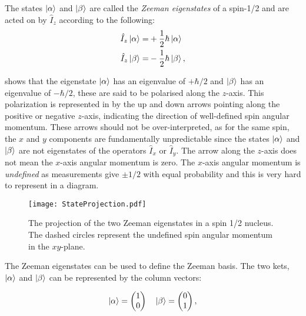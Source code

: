 The states $\ket{\alpha}$ and $\ket{\beta}$ are called the \textit{Zeeman eigenstates}
of a spin-1/2 and are acted on by $\hat{I}_z$ according to the following:
\begin{align}\label{eqn:momentum}
  \hat{I}_z\ket{\alpha} =& +\frac{1}{2}\hbar\ket{\alpha}\\
  \hat{I}_z\ket{\beta} =& -\frac{1}{2}\hbar\ket{\beta},
\end{align}

 shows that the eigenstate $\ket{\alpha}$ has an eigenvalue of
$+\hbar/2$ and $\ket{\beta}$ has an eigenvalue of $-\hbar/2$, these are said to
be polarised along the $z$-axis. This polarization is represented in
 by the up and down arrows pointing along the positive
or negative $z$-axis, indicating the direction of well-defined spin angular momentum.
These arrows should not be over-interpreted, as for the same spin,
the $x$ and $y$ components are fundamentally unpredictable
since the states $\ket{\alpha}$ and $\ket{\beta}$ are not eigenstates of the operators
$\hat{I}_x$ or $\hat{I}_y$. The arrow along the $z$-axis does not mean the
$x$-axis angular momentum is zero. The $x$-axis angular momentum is \textit{undefined}
as measurements give $±1/2$ with equal probability and this is very hard to represent
in a diagram.

\begin{figure}
  \begin{center}
  \texttt{[image: StateProjection.pdf]}
  \end{center}
  \caption{The projection of the two Zeeman eigenstates in a spin 1/2 nucleus. The dashed
  circles represent the undefined spin angular momentum in the $xy$-plane.}
  \label{fig:Projection}
\end{figure}


The Zeeman eigenstates can be used to define the Zeeman basis. The two kets, $\ket{\alpha}$ and $\ket{\beta}$ can be represented by the column vectors:

\begin{equation}
  \ket{\alpha} = \begin{pmatrix}
    1\\
    0
\end{pmatrix}\quad
 \ket{\beta} = \begin{pmatrix}
   0\\
   1
\end{pmatrix},
\end{equation}

